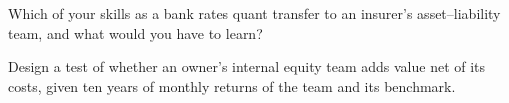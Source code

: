 \begin{interviewq}\label{iq:in:asset-managers-pensions-sovereign-funds-and-insurers:5}
Which of your skills as a bank rates quant transfer to an insurer's asset--liability team, and what would you have to
learn?
\end{interviewq}

\begin{interviewq}\label{iq:in:asset-managers-pensions-sovereign-funds-and-insurers:6}
Design a test of whether an owner's internal equity team adds value net of its costs, given ten years of monthly returns
of the team and its benchmark.
\end{interviewq}
